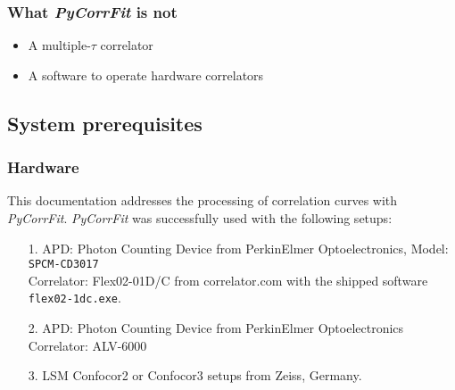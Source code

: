 \subsubsection*{What \textit{PyCorrFit} is not}
\begin{itemize}
\item A multiple-$\tau$ correlator
\item A software to operate hardware correlators
\end{itemize}

\subsection{System prerequisites}
\label{sec:intro.prere}
\subsubsection{Hardware}
\label{sec:intro.prere.hardw}
This documentation addresses the processing of correlation curves with \textit{PyCorrFit}. \textit{PyCorrFit} was successfully used with the following setups:
\begin{itemize}
\item[1.]
     APD: Photon Counting Device from PerkinElmer Optoelectronics, Model: 	 \texttt{SPCM-CD3017}\\
     Correlator: Flex02-01D/C from correlator.com with the shipped software 	
	    		 \texttt{flex02-1dc.exe}.
\item[2.]
    APD: Photon Counting Device from PerkinElmer Optoelectronics\\
    Correlator: ALV-6000
\item[3.] LSM Confocor2 or Confocor3 setups from Zeiss, Germany.
\end{itemize}

